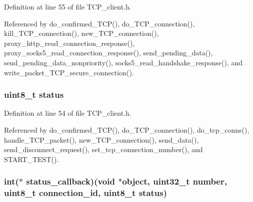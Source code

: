 Definition at line 55 of file T\+C\+P\+\_\+client.\+h.



Referenced by do\+\_\+confirmed\+\_\+\+T\+C\+P(), do\+\_\+\+T\+C\+P\+\_\+connection(), kill\+\_\+\+T\+C\+P\+\_\+connection(), new\+\_\+\+T\+C\+P\+\_\+connection(), proxy\+\_\+http\+\_\+read\+\_\+connection\+\_\+response(), proxy\+\_\+socks5\+\_\+read\+\_\+connection\+\_\+response(), send\+\_\+pending\+\_\+data(), send\+\_\+pending\+\_\+data\+\_\+nonpriority(), socks5\+\_\+read\+\_\+handshake\+\_\+response(), and write\+\_\+packet\+\_\+\+T\+C\+P\+\_\+secure\+\_\+connection().

\hypertarget{struct_t_c_p___client___connection_ade818037fd6c985038ff29656089758d}{
\subsubsection[{status}]{\setlength{\rightskip}{0pt plus 5cm}uint8\+\_\+t status}}\label{struct_t_c_p___client___connection_ade818037fd6c985038ff29656089758d}


Definition at line 54 of file T\+C\+P\+\_\+client.\+h.



Referenced by do\+\_\+confirmed\+\_\+\+T\+C\+P(), do\+\_\+\+T\+C\+P\+\_\+connection(), do\+\_\+tcp\+\_\+conns(), handle\+\_\+\+T\+C\+P\+\_\+packet(), new\+\_\+\+T\+C\+P\+\_\+connection(), send\+\_\+data(), send\+\_\+disconnect\+\_\+request(), set\+\_\+tcp\+\_\+connection\+\_\+number(), and S\+T\+A\+R\+T\+\_\+\+T\+E\+S\+T().

\hypertarget{struct_t_c_p___client___connection_a8c56af2094f8d2846998b395dbcaef18}{
\subsubsection[{status\+\_\+callback}]{\setlength{\rightskip}{0pt plus 5cm}int($\ast$ status\+\_\+callback)(void $\ast$object, uint32\+\_\+t {\bf number}, uint8\+\_\+t connection\+\_\+id, uint8\+\_\+t {\bf status})}}\label{struct_t_c_p___client___connection_a8c56af2094f8d2846998b395dbcaef18}


